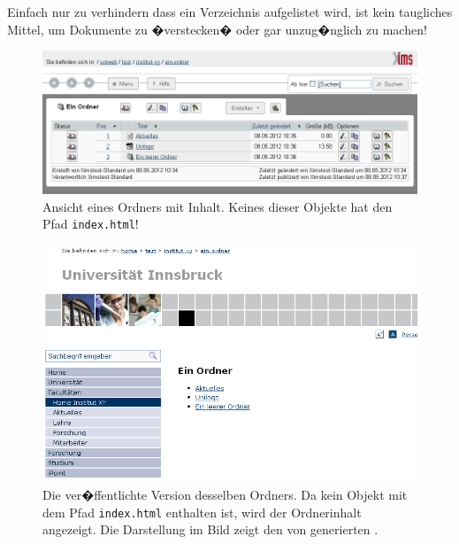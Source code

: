 \begin{Hinweis}
  Einfach nur zu verhindern dass ein Verzeichnis aufgelistet wird, ist
  kein taugliches Mittel, um Dokumente zu �verstecken� oder gar
  unzug�nglich zu machen!
\end{Hinweis}

\begin{figure}[!ht]
  \centering
  \includegraphics[width=\textwidth]{./images/ordnermitinhaltohneindex.png}
  \caption{ Ansicht eines Ordners mit Inhalt. Keines dieser Objekte hat 
   den Pfad
    \texttt{index.html}!}
  \label{fig:ordnerohneindex}
\end{figure}

\begin{figure}[!ht]
  \centering
  \includegraphics[width=\textwidth]{./images/ordnermitinhaltohneindex_publiziert.png}
  \caption{Die ver�ffentlichte Version desselben Ordners. Da kein Objekt mit 
  dem Pfad
   \texttt{index.html} enthalten ist, wird der Ordnerinhalt angezeigt. Die Darstellung im Bild
    zeigt den von  generierten .}
  \label{fig:ordnerohneindexpubliziert}
\end{figure}

